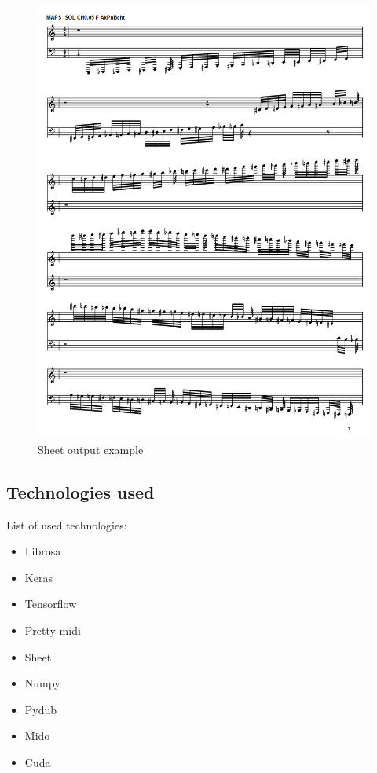 \begin{figure}[H]
	\caption[Sheet output example]{ Sheet output example }
	\centering
	\label{fig:sheet_output}
	\includegraphics[width=1\textwidth, height=\textheight, keepaspectratio]{"resources/sheet_example"}
\end{figure}

\subsection{Technologies used}
List of used technologies:
\begin{itemize}
	\item Librosa \cite{librosa}
	\item Keras \cite{keras}
	\item Tensorflow \cite{tensorflow}
	\item Pretty-midi \cite{pretty_midi}
	\item Sheet \cite{sheet}
	\item Numpy \cite{numpy}
	\item Pydub \cite{pydub}
	\item Mido \cite{mido}
	\item Cuda \cite{cuda}
	
\end{itemize}